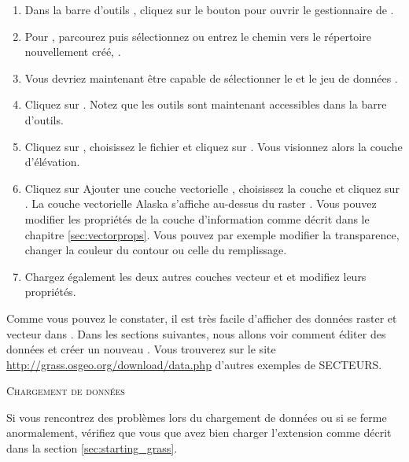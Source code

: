 \begin{enumerate}
  \item Dans la barre d'outils \grass, cliquez sur le bouton  pour ouvrir le gestionnaire de .
  \item Pour , parcourez puis sélectionnez ou entrez le chemin vers le répertoire nouvellement créé, .
  \item Vous devriez maintenant être capable de sélectionner le  et le jeu de données .
  \item Cliquez sur . Notez que les outils \grass sont maintenant accessibles dans la barre d'outils.
  \item Cliquez sur , choisissez le fichier  et cliquez sur . Vous visionnez alors la couche d'élévation.
  \item Cliquez sur  {Ajouter une couche vectorielle \grass}, choisissez la couche  et cliquez sur . La couche vectorielle Alaska s'affiche au-dessus du raster . Vous pouvez modifier les propriétés de la couche d'information comme décrit dans le chapitre \ref{sec:vectorprops}. Vous pouvez par exemple modifier la transparence, changer la couleur du contour ou celle du remplissage.
  \item Chargez également les deux autres couches vecteur  et  et modifiez leurs propriétés.
\end{enumerate}

Comme vous pouvez le constater, il est très facile d'afficher des données \grass raster et vecteur dans \qg.  Dans les sections suivantes, nous allons voir comment éditer des données \grass et créer un nouveau . Vous trouverez sur le site \grass \url{http://grass.osgeo.org/download/data.php} d'autres exemples de SECTEURS.

\begin{Tip}\caption{\textsc{Chargement de données \grass}}
Si vous rencontrez des problèmes lors du chargement de données ou si \qg se ferme anormalement, vérifiez que vous que avez bien charger l'extension \grass comme décrit dans la section \ref{sec:starting_grass}.
\end{Tip}

